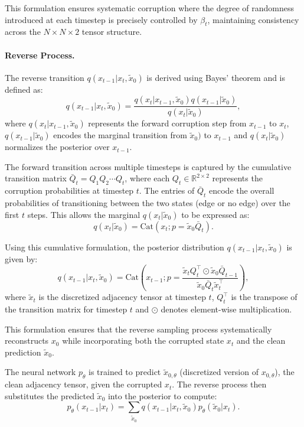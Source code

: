 This formulation ensures systematic corruption where the degree of randomness introduced at each timestep is precisely controlled by \(\beta_t\), maintaining consistency across the \(N \times N \times 2\) tensor structure.

\paragraph{Reverse Process.}  
The reverse transition \(q(x_{t-1} | x_t, \tilde{x}_0)\) is derived using Bayes' theorem and is defined as:
\[
q(x_{t-1} | x_t, \tilde{x}_0) = \frac{q(x_t | x_{t-1}, \tilde{x}_0) q(x_{t-1} | \tilde{x}_0)}{q(x_t | \tilde{x}_0)},
\]
where \(q(x_t | x_{t-1}, \tilde{x}_0)\) represents the forward corruption step from \(x_{t-1}\) to \(x_t\), \(q(x_{t-1} | \tilde{x}_0)\) encodes the marginal transition from \(\tilde{x}_0)\) to \(x_{t-1}\) and \(q(x_t | \tilde{x}_0)\) normalizes the posterior over \(x_{t-1}\).

The forward transition across multiple timesteps is captured by the cumulative transition matrix \(\bar{Q}_t = Q_1 Q_2 \cdots Q_t\), where each \(Q_t \in \mathbb{R}^{2 \times 2}\) represents the corruption probabilities at timestep \(t\). The entries of \(\bar{Q}_t\) encode the overall probabilities of transitioning between the two states (edge or no edge) over the first \(t\) steps. This allows the marginal \(q(x_t | \tilde{x}_0)\) to be expressed as:
\[
q(x_t | \tilde{x}_0) = \mathrm{Cat}\left( x_t; p = \tilde{x}_0 \bar{Q}_t \right).
\]

Using this cumulative formulation, the posterior distribution \(q(x_{t-1} | x_t, \tilde{x}_0)\) is given by:
\[
q(x_{t-1} | x_t, \tilde{x}_0) = \mathrm{Cat}\left( x_{t-1}; p = \frac{\tilde{x}_t Q_t^\top \odot \tilde{x}_0 \bar{Q}_{t-1}}{\tilde{x}_0 \bar{Q}_t \tilde{x}_t^\top} \right),
\]
where \(\tilde{x}_t\) is the discretized adjacency tensor at timestep \(t\), \(Q_t^\top\) is the transpose of the transition matrix for timestep \(t\) and \(\odot\) denotes element-wise multiplication.

This formulation ensures that the reverse sampling process systematically reconstructs \(x_0\) while incorporating both the corrupted state \(x_t\) and the clean prediction \(\tilde{x}_0\).

The neural network \(p_\theta\) is trained to predict \(\tilde{x}_{0, \theta}\) (discretized version of \(x_{0, \theta}\)), the clean adjacency tensor, given the corrupted \(x_t\). The reverse process then substitutes the predicted \(\tilde{x}_0\) into the posterior to compute:
\[
p_\theta(x_{t-1} | x_t) = \sum_{\tilde{x}_0} q(x_{t-1} | x_t, \tilde{x}_0) p_\theta(\tilde{x}_0 | x_t).
\]

